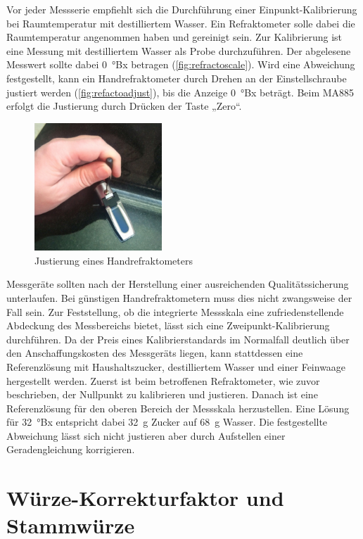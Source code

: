\documentclass[a4paper,parskip=half]{scrartcl}
\begin{document}
Vor jeder Messserie empfiehlt sich die Durchführung einer
Einpunkt-Kalibrierung bei Raumtemperatur mit destilliertem
Wasser. Ein Refraktometer solle dabei die Raumtemperatur
angenommen haben und gereinigt sein. Zur Kalibrierung ist
eine Messung mit destilliertem Wasser als Probe durchzuführen.
Der abgelesene Messwert sollte dabei 0~°Bx betragen
(\autoref{fig:refractoscale}).
Wird eine Abweichung festgestellt, kann ein Handrefraktometer durch
Drehen an der Einstellschraube justiert werden (\autoref{fig:refactoadjust}),
bis die Anzeige 0~°Bx beträgt. Beim MA885 erfolgt die
Justierung durch Drücken der Taste „Zero“.
\autocite{Bonham2001,Depalma2017,Terrill2013}

\begin{figure}[h]
\centering
\includegraphics[width=4.8cm]{images/adjust.jpg}
\caption{Justierung eines Handrefraktometers}
\label{fig:refactoadjust}
\end{figure}

Messgeräte sollten nach der Herstellung einer ausreichenden
Qualitätssicherung unterlaufen. Bei günstigen Handrefraktometern
muss dies nicht zwangsweise der Fall sein. Zur Feststellung,
ob die integrierte Messskala eine zufriedenstellende Abdeckung
des Messbereichs bietet, lässt sich eine Zweipunkt-Kalibrierung
durchführen. Da der Preis eines Kalibrierstandards im Normalfall
deutlich über den Anschaffungskosten des Messgeräts
liegen, kann stattdessen eine Referenzlösung mit Haushaltszucker,
destilliertem Wasser und einer Feinwaage hergestellt werden. Zuerst
ist beim betroffenen Refraktometer, wie zuvor beschrieben, der
Nullpunkt zu kalibrieren und justieren. Danach ist eine Referenzlösung
für den oberen Bereich der Messskala herzustellen. Eine Lösung 
für 32~°Bx entspricht dabei 32~g Zucker auf 68~g Wasser.
Die festgestellte Abweichung lässt sich nicht justieren aber
durch Aufstellen einer Geradengleichung korrigieren.
\autocite{Earl2015,Terrill2013,Troester2012}

\section*{Würze-Korrekturfaktor und Stammwürze}
\end{document}
